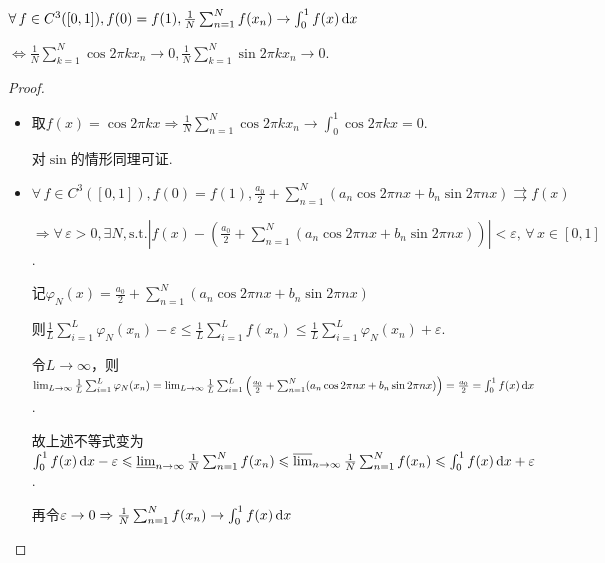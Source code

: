 \begin{theorem}
    $\forall\, f \in C^3([0,1]), f(0)=f(1),\frac{1}{N}\sum_{n=1}^N{f(x_n)}\to \int_{0}^{1}{f(x)}\mathop{}\!\mathrm{d} x$\par
    $\Leftrightarrow \frac{1}{N}\sum_{k=1}^N{\cos{2\pi kx_n}}\to 0,\frac{1}{N}\sum_{k=1}^N{\sin{2\pi kx_n}}\to 0$.\par
\end{theorem}
\begin{proof}
    \begin{itemize}
        \item[“$\Rightarrow$”] 取$f(x)=\cos{2\pi kx} \Rightarrow \frac{1}{N}\sum_{n=1}^N{\cos{2\pi kx_n}} \to \int_0^1{\cos{2\pi kx}} = 0$.\par
        对$\sin$的情形同理可证.
        \item[“$\Leftarrow$”] $\forall\, f \in C^3([0,1]),f(0)=f(1),\frac{a_0}{2}+\sum_{n=1}^N(a_n\cos{2\pi nx}+b_n\sin{2\pi nx})\rightrightarrows f(x)$\par
        $\Rightarrow \forall\, \varepsilon>0,\exists N,\text{s.t.}\left\lvert f(x) - \left(\frac{a_0}{2}+\sum_{n=1}^N(a_n\cos{2\pi nx}+b_n\sin{2\pi nx})\right)\right\rvert < \varepsilon,\,\forall\, x\in [0,1]$.\par
        记$\varphi_N(x) = \frac{a_0}{2}+\sum_{n=1}^N(a_n\cos{2\pi nx}+b_n\sin{2\pi nx})$\par
        则$\frac{1}{L}\sum_{i=1}^L{\varphi_N(x_n)} - \varepsilon \leq \frac{1}{L}\sum_{i=1}^L{f(x_n)} \leq \frac{1}{L}\sum_{i=1}^L{\varphi_N(x_n)} + \varepsilon$.\par
        令$L\to\infty$，则$\lim_{L\to\infty}\frac{1}{L}\sum_{i=1}^L{\varphi_N(x_n)}=\lim_{L\to\infty}{\frac{1}{L}\sum_{i=1}^L{\left(\frac{a_0}{2}+\sum_{n=1}^N(a_n\cos{2\pi nx}+b_n\sin{2\pi nx})\right)}}=\frac{a_0}{2}=\int_0^1{f(x)}\mathop{}\!\mathrm{d} x$.\par
        故上述不等式变为$\int_0^1{f(x)}\mathop{}\!\mathrm{d} x-\varepsilon \leqslant \varliminf_{n\to\infty}{\frac{1}{N}\sum_{n=1}^N{f(x_n)}} \leqslant \varlimsup_{n\to\infty}{\frac{1}{N}\sum_{n=1}^N{f(x_n)}} \leqslant \int_0^1{f(x)}\mathop{}\!\mathrm{d} x+\varepsilon$.\par
        再令$\varepsilon\to 0 \Rightarrow \frac{1}{N}\sum_{n=1}^N{f(x_n)}\to \int_{0}^{1}{f(x)}\mathop{}\!\mathrm{d} x$
    \end{itemize}
\end{proof}\par\noindent

